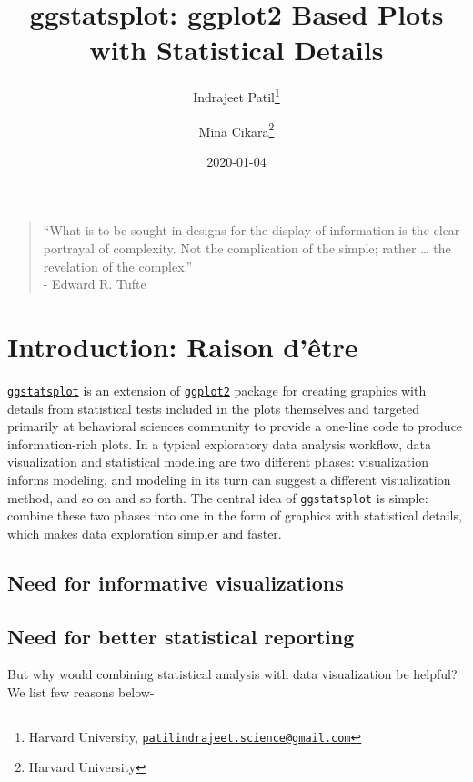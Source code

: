 \documentclass[
]{article}
\title{ggstatsplot: ggplot2 Based Plots with Statistical Details}
\author{Indrajeet Patil\footnote{Harvard University, \href{mailto:patilindrajeet.science@gmail.com}{\nolinkurl{patilindrajeet.science@gmail.com}}} \and Mina Cikara\footnote{Harvard University}}
\date{2020-01-04}
\begin{document}
\maketitle

{
\hypersetup{linkcolor=}
\setcounter{tocdepth}{2}
\tableofcontents
}
\begin{quote}
``What is to be sought in designs for the display of information is the clear
portrayal of complexity. Not the complication of the simple; rather \ldots{} the
revelation of the complex.''\\
- Edward R. Tufte
\end{quote}

\hypertarget{introduction-raison-duxeatre}{%
\section{Introduction: Raison d'être}\label{introduction-raison-duxeatre}}

\href{https://indrajeetpatil.github.io/ggstatsplot/}{\texttt{ggstatsplot}} is an extension
of \href{https://github.com/tidyverse/ggplot2}{\texttt{ggplot2}} package for creating
graphics with details from statistical tests included in the plots themselves
and targeted primarily at behavioral sciences community to provide a one-line
code to produce information-rich plots. In a typical exploratory data analysis
workflow, data visualization and statistical modeling are two different phases:
visualization informs modeling, and modeling in its turn can suggest a
different visualization method, and so on and so forth. The central idea of
\texttt{ggstatsplot} is simple: combine these two phases into one in the form of
graphics with statistical details, which makes data exploration simpler and
faster.

\hypertarget{need-for-informative-visualizations}{%
\subsection{Need for informative visualizations}\label{need-for-informative-visualizations}}

\hypertarget{need-for-better-statistical-reporting}{%
\subsection{Need for better statistical reporting}\label{need-for-better-statistical-reporting}}

But why would combining statistical analysis with data visualization be helpful?
We list few reasons below-
\end{document}
